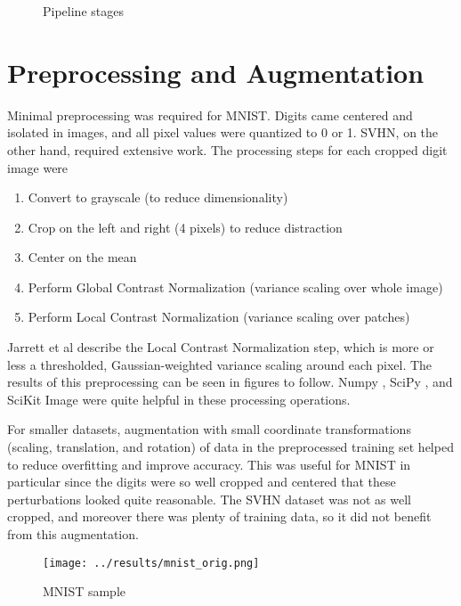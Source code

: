 \documentclass{article}
\begin{document}
\begin{figure}[htbp]
  \centering
  
  \caption{Pipeline stages}
  \label{fig:pipeline}
\end{figure}

\section{Preprocessing and Augmentation}

Minimal preprocessing was required for MNIST. Digits came centered and isolated in images, and all pixel values were quantized to 0 or 1. SVHN, on the other hand, required extensive work. The processing steps for each cropped digit image were

\begin{enumerate}
  \item Convert to grayscale (to reduce dimensionality)
  \item Crop on the left and right (4 pixels) to reduce distraction
  \item Center on the mean
  \item Perform Global Contrast Normalization (variance scaling over whole image)
  \item Perform Local Contrast Normalization (variance scaling over patches)
\end{enumerate}

Jarrett et al \cite{jarrett2009best} describe the Local Contrast Normalization step, which is more or less a thresholded, Gaussian-weighted variance scaling around each pixel. The results of this preprocessing can be seen in figures to follow. Numpy \cite{van2011numpy}, SciPy \cite{scipy}, and SciKit Image \cite{van2014scikit} were quite helpful in these processing operations.

For smaller datasets, augmentation with small coordinate transformations (scaling, translation, and rotation) of data in the preprocessed training set helped to reduce overfitting and improve accuracy. This was useful for MNIST in particular since the digits were so well cropped and centered that these perturbations looked quite reasonable. The SVHN dataset was not as well cropped, and moreover there was plenty of training data, so it did not benefit from this augmentation.

\begin{figure}[htbp]
  \centering
  \texttt{[image: ../results/mnist\_orig.png]}
  \caption{MNIST sample}
  \label{fig:mnist_orig}
\end{figure}
\end{document}

